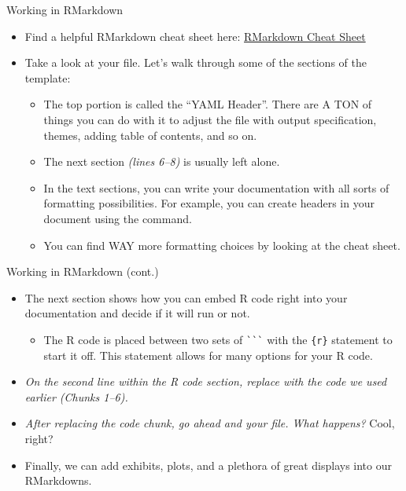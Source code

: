 \begin{frame}{Working in RMarkdown}
\begin{itemize}
  \item Find a helpful RMarkdown cheat sheet here:
  \href{https://rstudio.com/wp-content/uploads/2015/02/rmarkdown-cheatsheet.pdf}{RMarkdown Cheat Sheet}
  \item Take a look at your  file. Let’s walk through some of the sections of the template:
  \begin{itemize}
    \item The top portion is called the “YAML Header”. There are A TON of things you can do with it to adjust the file with output specification, themes, adding table of contents, and so on.
    \item The next section \textit{(lines 6--8)} is usually left alone.
    \item In the text sections, you can write your documentation with all sorts of formatting possibilities. For example, you can create headers in your document using the \code{\#} command.
    \item You can find WAY more formatting choices by looking at the cheat sheet.
  \end{itemize}
\end{itemize}
\end{frame}

\begin{frame}[fragile]{Working in RMarkdown (cont.)}
\begin{itemize}
  \item The next section shows how you can embed R code right into your documentation and decide if it will run or not.
  \begin{itemize}
    \item The R code is placed between two sets of \lstinline|```| with the \lstinline|{r}| statement to start it off. This statement allows for many options for your R code.
  \end{itemize}
  \item \textit{On the second line within the R code section, replace  with the code we used earlier (Chunks 1--6).}
  \item \textit{After replacing the code chunk, go ahead and  your file. What happens?} Cool, right?
  \item Finally, we can add exhibits, plots, and a plethora of great displays into our RMarkdowns.
\end{itemize}
\end{frame}
